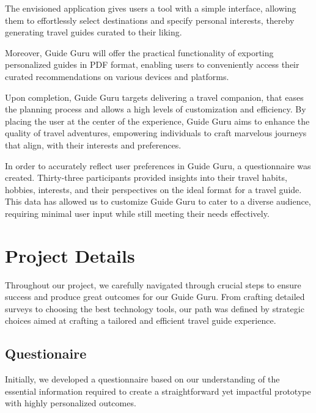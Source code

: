 \documentclass[english,notitlepage,smartquotes]{hgbreport}
\begin{document}
The envisioned application gives users a tool with a simple interface, allowing them to effortlessly select destinations and specify personal interests, thereby generating travel guides curated to their liking.

Moreover, Guide Guru will offer the practical functionality of exporting personalized guides in PDF format, enabling users to conveniently access their curated recommendations on various devices and platforms.

Upon completion, Guide Guru targets delivering a travel companion, that eases the planning process and allows a high levels of customization and efficiency. By placing the user at the center of the experience, Guide Guru aims to enhance the quality of travel adventures, empowering individuals to craft marvelous journeys that align, with their interests and preferences.

In order to accurately reflect user preferences in Guide Guru, a questionnaire was created. Thirty-three participants provided insights into their travel habits, hobbies, interests, and their perspectives on the ideal format for a travel guide. This data has allowed us to customize Guide Guru to cater to a diverse audience, requiring minimal user input while still meeting their needs effectively.

\chapter{Project Details}
Throughout our project, we carefully navigated through crucial steps to ensure success and produce great outcomes for our Guide Guru. From crafting detailed surveys to choosing the best technology tools, our path was defined by strategic choices aimed at crafting a tailored and efficient travel guide experience.

\section{Questionaire}

Initially, we developed a questionnaire based on our understanding of the essential information required to create a straightforward yet impactful prototype with highly personalized outcomes.
\end{document}
